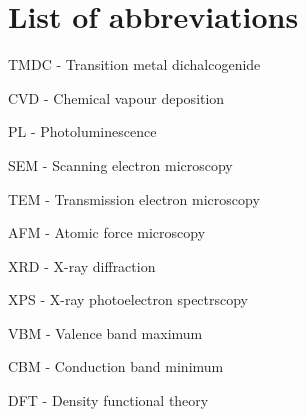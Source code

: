 \section*{List of abbreviations}

TMDC - Transition metal dichalcogenide

CVD - Chemical vapour deposition

PL - Photoluminescence

SEM - Scanning electron microscopy

TEM - Transmission electron microscopy

AFM - Atomic force microscopy

XRD - X-ray diffraction

XPS - X-ray photoelectron spectrscopy

VBM - Valence band maximum

CBM - Conduction band minimum

DFT - Density functional theory